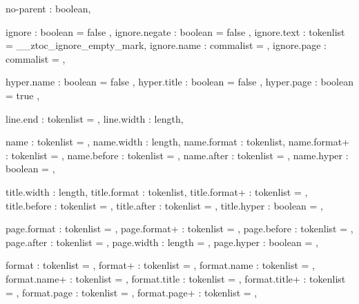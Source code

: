\gdef\ztoc@leader@type{}
\gdef\ztoc@leader@content{.}
\long\gdef\ztoc@line@end{\par}
\def\ztoc@ignore@level{}

\newlength{\ztoc@rmargin}
\newlength{\ztoc@page@width}
\newlength{\ztoc@leader@sep}
\newlength{\ztoc@leader@raise}
\setlength{\ztoc@rmargin}{\@tocrmarg}
\setlength{\ztoc@leader@sep}{4.5pt}
\setlength{\ztoc@leader@raise}{0pt}
\setlength{\ztoc@page@width}{\@pnumwidth}

  {
    no-parent     : boolean,

    ignore        : boolean    = { false },
    ignore.negate : boolean    = { false },
    ignore.text   : tokenlist  = \s__ztoc_ignore_empty_mark,
    ignore.name   : commalist  = { },
    ignore.page   : commalist  = { },

    hyper.name    : boolean    = { false },
    hyper.title   : boolean    = { false },
    hyper.page    : boolean    = { true },

    line.end      : tokenlist  = \ztoc@line@end,
    line.width    : length,

    name          : tokenlist  = { },
    name.width    : length,
    name.format   : tokenlist,
    name.format+  : tokenlist  = { },
    name.before   : tokenlist  = { },
    name.after    : tokenlist  = { },
    name.hyper    : boolean    = ,

    title.width   : length,
    title.format  : tokenlist,
    title.format+ : tokenlist  = { },
    title.before  : tokenlist  = { },
    title.after   : tokenlist  = { },
    title.hyper   : boolean    = ,

    page.format   : tokenlist  = \normalfont\normalcolor,
    page.format+  : tokenlist  = { },
    page.before   : tokenlist  = { },
    page.after    : tokenlist  = { },
    page.width    : length     = \ztoc@page@width,
    page.hyper    : boolean    = ,

    format        : tokenlist  = { },
    format+       : tokenlist  = { },
    format.name   : tokenlist  = ,
    format.name+  : tokenlist  = ,
    format.title  : tokenlist  = ,
    format.title+ : tokenlist  = ,
    format.page   : tokenlist  = ,
    format.page+  : tokenlist  = ,

}
